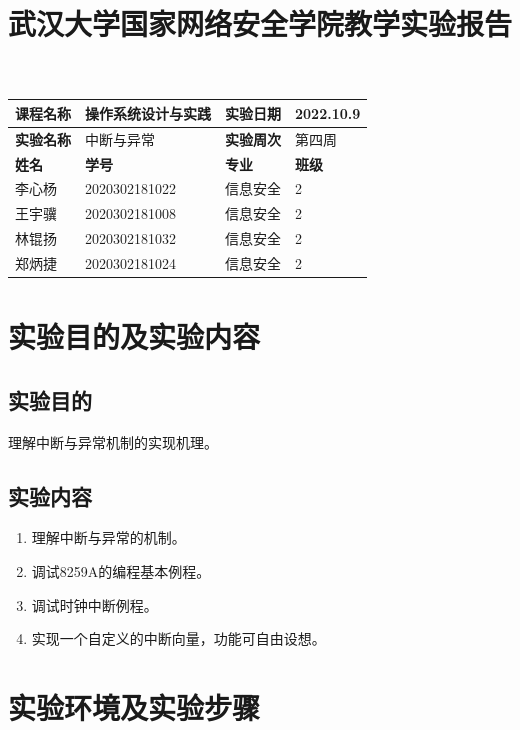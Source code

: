 \documentclass[UTF8,12pt]{ctexart}
\title{\vspace{-1.9cm}\textbf{武汉大学国家网络安全学院教学实验报告}}
\date{\vspace{-2.5cm}}
\begin{document}
    \maketitle
    \thispagestyle{fancy}
    
    \begin{table}[H]
    \centering
    \begin{tabular}{|p{2.5cm}<{\centering}|p{4.5cm}<{\centering}|p{3cm}<{\centering}|p{2.5cm}<{\centering}|}
    \hline
    \textbf{课程名称} & 操作系统设计与实践     & \textbf{实验日期} & 2022.10.9   \\ \hline
    \textbf{实验名称} & 中断与异常          & \textbf{实验周次} & 第四周         \\ \hline
    \textbf{姓名}   & \textbf{学号}   & \textbf{专业}   & \textbf{班级} \\ \hline
    李心杨           & 2020302181022 & 信息安全          & 2           \\ \hline
    王宇骥           & 2020302181008 & 信息安全          & 2           \\ \hline
    林锟扬           & 2020302181032 & 信息安全          & 2           \\ \hline
    郑炳捷           & 2020302181024 & 信息安全          & 2           \\ \hline
    \end{tabular}
    \end{table}
    
    \section{实验目的及实验内容}
    \subsection{实验目的}
    理解中断与异常机制的实现机理。
    \subsection{实验内容}
    \begin{enumerate}
    \item 理解中断与异常的机制。
    \item 调试8259A的编程基本例程。
    \item 调试时钟中断例程。
    \item 实现一个自定义的中断向量，功能可自由设想。
    \end{enumerate}
    \section{实验环境及实验步骤}
\end{document}
